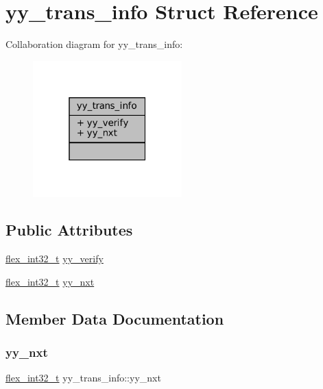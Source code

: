 \hypertarget{structyy__trans__info}{}\section{yy\+\_\+trans\+\_\+info Struct Reference}
\label{structyy__trans__info}


Collaboration diagram for yy\+\_\+trans\+\_\+info\+:
\nopagebreak
\begin{figure}[H]
\begin{center}
\leavevmode
\includegraphics[width=163pt]{structyy__trans__info__coll__graph}
\end{center}
\end{figure}
\subsection*{Public Attributes}
\begin{DoxyCompactItemize}
\item 
\hyperlink{lex_8json_8cc_a838ce943cf44ef7769480714fc6c3ba9}{flex\+\_\+int32\+\_\+t} \hyperlink{structyy__trans__info_a5c9f61e770deef50bd4e697310342fe9}{yy\+\_\+verify}
\item 
\hyperlink{lex_8json_8cc_a838ce943cf44ef7769480714fc6c3ba9}{flex\+\_\+int32\+\_\+t} \hyperlink{structyy__trans__info_ae0715250c2bef261e596e77e0030f13e}{yy\+\_\+nxt}
\end{DoxyCompactItemize}


\subsection{Member Data Documentation}
\mbox{\label{structyy__trans__info_ae0715250c2bef261e596e77e0030f13e}} 
\subsubsection{\texorpdfstring{yy\+\_\+nxt}{yy\_nxt}}
{\footnotesize\ttfamily \hyperlink{lex_8json_8cc_a838ce943cf44ef7769480714fc6c3ba9}{flex\+\_\+int32\+\_\+t} yy\+\_\+trans\+\_\+info\+::yy\+\_\+nxt}

